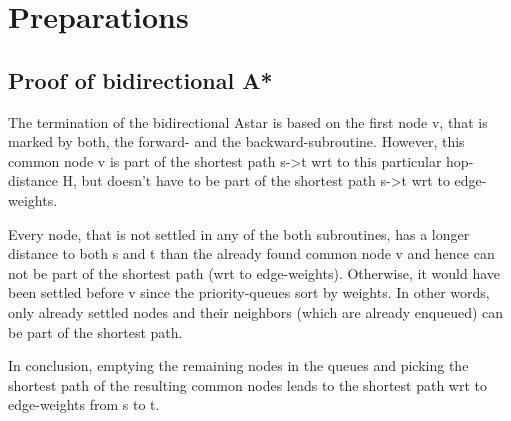 \chapter{Preparations}
\label{chap:preparations}

    \section{Proof of bidirectional A*}

    The termination of the bidirectional Astar is based on the first node v, that is marked by both, the forward- and the backward-subroutine.
    However, this common node v is part of the shortest path s->t wrt to this particular hop-distance H, but doesn't have to be part of the shortest path s->t wrt to edge-weights.

    Every node, that is not settled in any of the both subroutines, has a longer distance to both s and t than the already found common node v and hence can not be part of the shortest path (wrt to edge-weights).
    Otherwise, it would have been settled before v since the priority-queues sort by weights.
    In other words, only already settled nodes and their neighbors (which are already enqueued) can be part of the shortest path.

    In conclusion, emptying the remaining nodes in the queues and picking the shortest path of the resulting common nodes leads to the shortest path wrt to edge-weights from s to t.